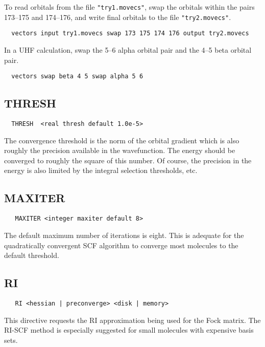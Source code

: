 \fussy

To read orbitals from the file \verb+"try1.movecs"+, swap the orbitals
within the pairs 173--175 and 174--176, and write final orbitals to
the file \verb+"try2.movecs"+.
\begin{verbatim}
  vectors input try1.movecs swap 173 175 174 176 output try2.movecs
\end{verbatim}

In a UHF calculation, swap the 5--6 alpha orbital pair and the 4--5
beta orbital pair.
\begin{verbatim}
  vectors swap beta 4 5 swap alpha 5 6
\end{verbatim}


\subsection{THRESH}

\begin{verbatim}
  THRESH  <real thresh default 1.0e-5>
\end{verbatim}

The convergence threshold is the norm of the orbital gradient which is
also roughly the precision available in the wavefunction.  The energy
should be converged to roughly the square of this number.  Of course,
the precision in the energy is also limited by the integral selection
thresholds, etc. 

\subsection{MAXITER}

\begin{verbatim}
   MAXITER <integer maxiter default 8>
\end{verbatim}

The default maximum number of iterations is eight.  This is adequate for
the quadratically convergent SCF algorithm to converge most molecules
to the default threshold.

\subsection{RI}

\begin{verbatim}
   RI <hessian | preconverge> <disk | memory>
\end{verbatim}

This directive requests the RI approximation being used for the Fock matrix.
The RI-SCF method is especially suggested for small molecules with
expensive basis sets.

